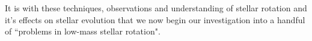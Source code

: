 It is with these techniques, observations and understanding of stellar rotation and it's effects on stellar evolution that we now begin our investigation into a handful of ``problems in low-mass stellar rotation".



%
%
%
%
